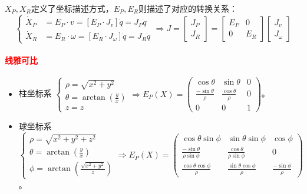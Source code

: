 \documentclass[
12pt, %
a4paper, 
oneside, %
]{scrartcl}
\begin{document}
$ X_P, X_R $定义了坐标描述方式，$ E_P, E_R $则描述了对应的转换关系：
$$
\begin{cases} \dot{X}_P &= E_P \cdot v = [E_P \cdot J_v] \dot{q} = J_P \dot{q} \\ \dot{X}_R &= E_R \cdot \omega = [E_R \cdot J_\omega] \dot{q} = J_R \dot{q} \end{cases}
\Longrightarrow
J = \begin{bmatrix} J_P \\ J_R \end{bmatrix} = \begin{bmatrix} E_P & 0 \\ 0 & E_R \end{bmatrix} \begin{bmatrix} J_v \\ J_\omega \end{bmatrix}
$$
\paragraph{\textcolor{red}{线雅可比}}
\begin{itemize}
\item 柱坐标系
$
\begin{cases} \rho = \sqrt{x^2 + y^2} \\ \theta = \arctan(\frac{y}{x}) \\ z = z \end{cases}
\Rightarrow
E_P(X) = \begin{pmatrix} \cos\theta & \sin\theta & 0 \\ \frac{-\sin\theta}{\rho} & \frac{\cos\theta}{\rho} & 0 \\ 0 & 0 & 1 \end{pmatrix}
$。
\item 球坐标系
$
\begin{cases} \rho = \sqrt{x^2 + y^2 + z^2} \\ \theta = \arctan(\frac{y}{x}) \\ \phi = \arctan(\frac{\sqrt{x^2 + y^2}}{z}) \end{cases}
\Rightarrow
E_P(X) = \begin{pmatrix} \cos\theta \sin\phi & \sin\theta \sin\phi & \cos\phi \\ \frac{-\sin\theta}{\rho \sin\phi} & \frac{\cos\theta}{\rho \sin\phi} & 0 \\ \frac{\cos\theta \cos\phi}{\rho} & \frac{\sin\theta \cos\phi}{\rho} & \frac{-\sin\phi}{\rho} \end{pmatrix}
$。
\end{itemize} 
\end{document}
